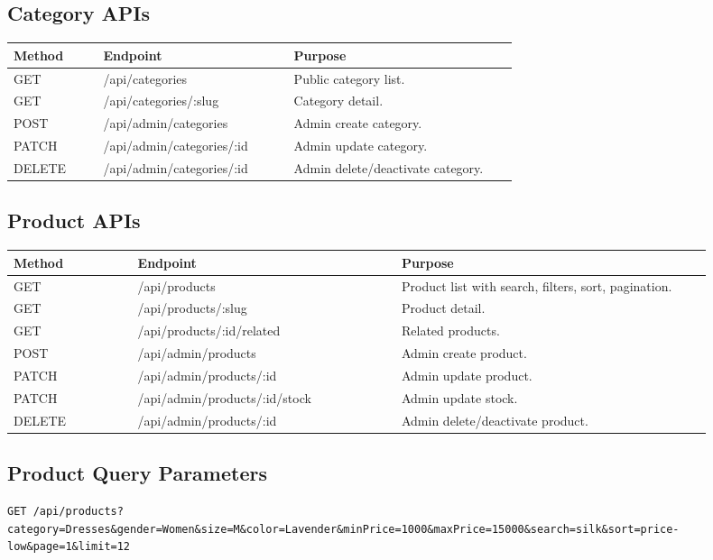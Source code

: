 \documentclass[11pt,a4paper]{article}
\begin{document}
\subsection{Category APIs}

\begin{longtable}{p{0.16\linewidth} p{0.34\linewidth} p{0.40\linewidth}}
\toprule
\textbf{Method} & \textbf{Endpoint} & \textbf{Purpose} \\
\midrule
GET & /api/categories & Public category list. \\
GET & /api/categories/:slug & Category detail. \\
POST & /api/admin/categories & Admin create category. \\
PATCH & /api/admin/categories/:id & Admin update category. \\
DELETE & /api/admin/categories/:id & Admin delete/deactivate category. \\
\bottomrule
\end{longtable}

\subsection{Product APIs}

\begin{longtable}{p{0.16\linewidth} p{0.34\linewidth} p{0.40\linewidth}}
\toprule
\textbf{Method} & \textbf{Endpoint} & \textbf{Purpose} \\
\midrule
GET & /api/products & Product list with search, filters, sort, pagination. \\
GET & /api/products/:slug & Product detail. \\
GET & /api/products/:id/related & Related products. \\
POST & /api/admin/products & Admin create product. \\
PATCH & /api/admin/products/:id & Admin update product. \\
PATCH & /api/admin/products/:id/stock & Admin update stock. \\
DELETE & /api/admin/products/:id & Admin delete/deactivate product. \\
\bottomrule
\end{longtable}

\subsection{Product Query Parameters}

\begin{lstlisting}[style=code]
GET /api/products?category=Dresses&gender=Women&size=M&color=Lavender&minPrice=1000&maxPrice=15000&search=silk&sort=price-low&page=1&limit=12
\end{lstlisting}
\end{document}
